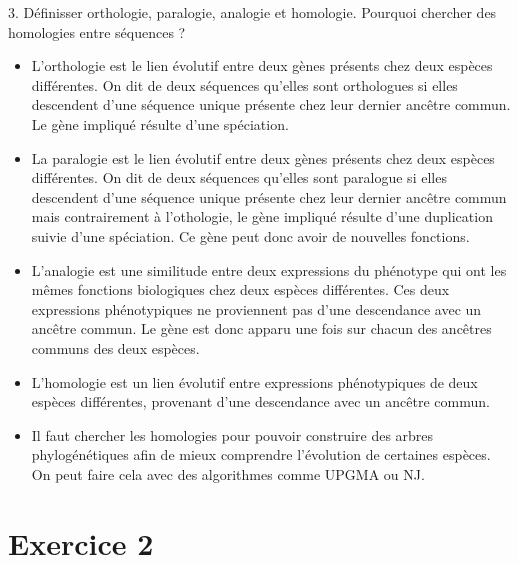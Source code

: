 \documentclass[
	12pt, %
]{fphw}
\begin{document}
\begin{problem}
	3. Définisser orthologie, paralogie, analogie et homologie. Pourquoi chercher des homologies entre séquences ?
\end{problem}
\begin{center}
	\begin{itemize}
		\item L'orthologie est le lien évolutif entre deux gènes présents chez deux espèces différentes. On dit de deux séquences qu'elles sont orthologues si elles descendent d'une séquence unique présente chez leur dernier ancêtre commun. Le gène impliqué résulte d'une spéciation.
		\item La paralogie est le lien évolutif entre deux gènes présents chez deux espèces différentes. On dit de deux séquences qu'elles sont paralogue si elles descendent d'une séquence unique présente chez leur dernier ancêtre commun mais contrairement à l'othologie, le gène impliqué résulte d'une duplication suivie d'une spéciation. Ce gène peut donc avoir de nouvelles fonctions.
		\item L'analogie est une similitude entre deux expressions du phénotype qui ont les mêmes fonctions biologiques chez deux espèces différentes. Ces deux expressions phénotypiques ne proviennent pas d'une descendance avec un ancêtre commun. Le gène est donc apparu une fois sur chacun des ancêtres communs des deux espèces.
		\item L'homologie est un lien évolutif entre expressions phénotypiques de deux espèces différentes, provenant d'une descendance avec un ancêtre commun.
		\item Il faut chercher les homologies pour pouvoir construire des arbres phylogénétiques afin de mieux comprendre l'évolution de certaines espèces. On peut faire cela avec des algorithmes comme UPGMA ou NJ.
	\end{itemize}
\end{center}


\section*{Exercice 2}
\end{document}
